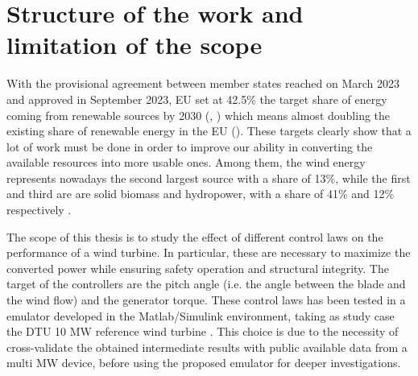 \newpage
\section{Structure of the work and limitation of the scope}\label{sec:b_introduction}
With the provisional agreement between member states reached on March 2023 and approved in September 2023, EU set at 42.5\% the target share of energy coming from renewable sources by 2030 (\cite{rauters}, \cite{EU_targets}) which means almost doubling the existing share of renewable energy in the EU (\cite{EU_targets}). These targets clearly show that a lot of work must be done in order to improve our ability in converting the available resources into more usable ones. Among them, the wind energy represents nowadays the second largest source with a share of 13\%, while the first and third are are solid biomass and hydropower, with a share of 41\% and 12\% respectively \cite{ren_share}. 

The scope of this thesis is to study the effect of different control laws on the performance of a wind turbine. In particular, these are necessary to maximize the converted power while ensuring safety operation and structural integrity. The target of the controllers are the pitch angle (i.e. the angle between the blade and the wind flow) and the generator torque. These control laws has been tested in a emulator developed in the Matlab/Simulink environment, taking as study case the DTU 10 MW reference wind turbine \cite{DTU_Wind_Energy_Report-I-0092}. This choice is due to the necessity of cross-validate the obtained intermediate results with public available data from a multi MW device, before using the proposed emulator for deeper investigations. 

